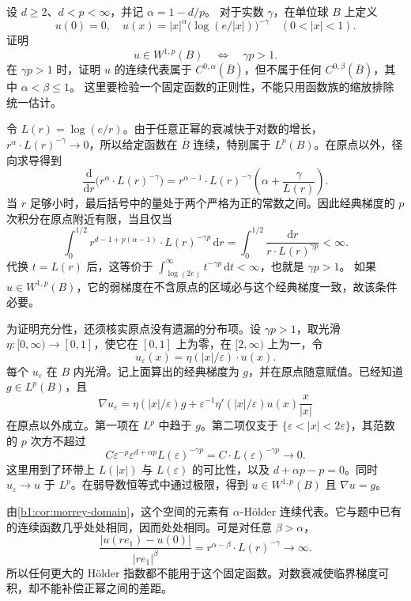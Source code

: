 \begin{exercise}\label{b1:ex:24-morrey-logarithmic-cusp}
设 \(d\ge2\)、\(d<p<\infty\)，并记 \(\alpha=1-d/p\)。
对于实数 \(\gamma\)，在单位球 \(B\) 上定义
\[
 u(0)=0,\quad
 u(x)=|x|^\alpha\bigl(\log(e/|x|)\bigr)^{-\gamma}
                  \quad(0<|x|<1).
\]
证明
\[
 u\in W^{1,p}(B)\quad\Longleftrightarrow\quad\gamma p>1.
\]
在 \(\gamma p>1\) 时，证明 \(u\) 的连续代表属于 \(C^{0,\alpha}(\overline B)\)，但不属于任何
\(C^{0,\beta}(\overline B)\)，其中 \(\alpha<\beta\le1\)。
这里要检验一个固定函数的正则性，不能只用函数族的缩放排除统一估计。
\end{exercise}
\begin{solution}
令 \(L(r)=\log(e/r)\)。由于任意正幂的衰减快于对数的增长，
\(r^\alpha\cdot L(r)^{-\gamma}\to0\)，所以给定函数在 \(\overline B\) 连续，特别属于
\(L^p(B)\)。在原点以外，径向求导得到
\[
 \frac{\mathrm d}{\mathrm dr}
       \bigl(r^\alpha\cdot L(r)^{-\gamma}\bigr)
 =r^{\alpha-1}\cdot L(r)^{-\gamma}
                     \left(\alpha+\frac\gamma{L(r)}\right).
\]
当 \(r\) 足够小时，最后括号中的量处于两个严格为正的常数之间。因此经典梯度的
\(p\) 次积分在原点附近有限，当且仅当
\[
 \int_0^{1/2}r^{d-1+p(\alpha-1)}\cdot L(r)^{-\gamma p}\,\mathrm dr
 =\int_0^{1/2}\frac{\mathrm dr}{r\cdot L(r)^{\gamma p}}<\infty.
\]
代换 \(t=L(r)\) 后，这等价于 \(\int_{\log(2e)}^\infty t^{-\gamma p}\,\mathrm dt<\infty\)，也就是 \(\gamma p>1\)。
如果 \(u\in W^{1,p}(B)\)，它的弱梯度在不含原点的区域必与这个经典梯度一致，故该条件必要。

为证明充分性，还须核实原点没有遗漏的分布项。设 \(\gamma p>1\)，取光滑
\(\eta:[0,\infty)\to[0,1]\)，使它在 \([0,1]\) 上为零，在 \([2,\infty)\) 上为一，令
\[
 u_\varepsilon(x)=\eta(|x|/\varepsilon)\cdot u(x).
\]
每个 \(u_\varepsilon\) 在 \(B\) 内光滑。记上面算出的经典梯度为 \(g\)，并在原点随意赋值。已经知道 \(g\in L^p(B)\)，且
\[
 \nabla u_\varepsilon
  =\eta(|x|/\varepsilon)g
       +\varepsilon^{-1}\eta'(|x|/\varepsilon)
                         u(x)\frac{x}{|x|}
\]
在原点以外成立。第一项在 \(L^p\) 中趋于 \(g\)。第二项仅支于
\(\{\varepsilon<|x|<2\varepsilon\}\)，其范数的 \(p\) 次方不超过
\[
 C\varepsilon^{-p}\varepsilon^{d+\alpha p}
                  L(\varepsilon)^{-\gamma p}
   =C\cdot L(\varepsilon)^{-\gamma p}\longrightarrow0.
\]
这里用到了环带上 \(L(|x|)\) 与 \(L(\varepsilon)\) 的可比性，以及
\(d+\alpha p-p=0\)。同时 \(u_\varepsilon\to u\) 于 \(L^p\)。在弱导数恒等式中通过极限，得到 \(u\in W^{1,p}(B)\) 且 \(\nabla u=g\)。

由\cref{b1:cor:morrey-domain}，这个空间的元素有 \(\alpha\)-Hölder 连续代表。它与题中已有的连续函数几乎处处相同，因而处处相同。可是对任意 \(\beta>\alpha\)，
\[
 \frac{|u(re_1)-u(0)|}{|re_1|^\beta}
       =r^{\alpha-\beta}\cdot L(r)^{-\gamma}
                  \longrightarrow\infty.
\]
所以任何更大的 Hölder 指数都不能用于这个固定函数。对数衰减使临界梯度可积，却不能补偿正幂之间的差距。
\end{solution}

